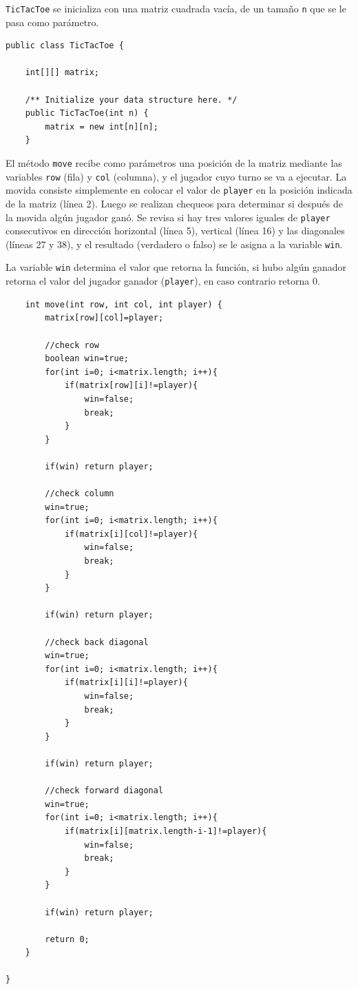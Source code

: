 \texttt{TicTacToe} se inicializa con una matriz cuadrada vacía, de un tamaño \texttt{n} que se le pasa como parámetro. 

\begin{verbatim}
public class TicTacToe {
 
    int[][] matrix;
 
    /** Initialize your data structure here. */
    public TicTacToe(int n) {
        matrix = new int[n][n];
    }
\end{verbatim} 

El método \texttt{move} recibe como parámetros una posición de la matriz mediante las variables \texttt{row} (fila) y \texttt{col} (columna), y el jugador cuyo turno se va a ejecutar. La movida consiste simplemente en colocar el valor de \texttt{player} en la posición indicada de la matriz (línea 2).
Luego se realizan chequeos para determinar si después de la movida algún jugador ganó. Se revisa si hay tres valores iguales de \texttt{player} consecutivos en dirección horizontal (línea 5), vertical (línea 16) y las diagonales (líneas 27 y 38), y el resultado (verdadero o falso) se le asigna a la variable \texttt{win}.

La variable \texttt{win} determina el valor que retorna la función, si hubo algún ganador retorna el valor del jugador ganador (\texttt{player}), en caso contrario retorna 0.

\begin{verbatim}
    int move(int row, int col, int player) {
        matrix[row][col]=player;
 
        //check row
        boolean win=true;
        for(int i=0; i<matrix.length; i++){
            if(matrix[row][i]!=player){
                win=false;
                break;
            }
        }
 
        if(win) return player;
 
        //check column
        win=true;
        for(int i=0; i<matrix.length; i++){
            if(matrix[i][col]!=player){
                win=false;
                break;
            }
        }
 
        if(win) return player;
 
        //check back diagonal
        win=true;
        for(int i=0; i<matrix.length; i++){
            if(matrix[i][i]!=player){
                win=false;
                break;
            }
        }
 
        if(win) return player;
 
        //check forward diagonal
        win=true;
        for(int i=0; i<matrix.length; i++){
            if(matrix[i][matrix.length-i-1]!=player){
                win=false;
                break;
            }
        }
 
        if(win) return player;
 
        return 0;
    }

}
\end{verbatim}


